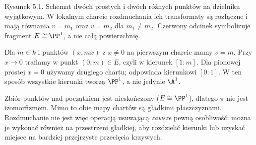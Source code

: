 \begin{center}

{\small Rysunek 5.1. Schemat dwóch prostych i dwóch różnych punktów na dzielniku wyjątkowym. W lokalnym charcie rozdmuchania ich transformaty są rozłączne i mają równania $v=m_1$ oraz $v=m_2$ dla $m_1\ne m_2$. Czerwony odcinek symbolizuje fragment $E\cong\PP^1$, a nie całą powierzchnię.}\par
\end{center}

\begin{przyklad}
Dla $m\in k$ i punktów $(x,mx)$ z $x\ne0$ na
pierwszym charcie mamy $v=m$. Przy $x\to0$ trafiamy
w punkt $(0,m)\in E$, czyli w kierunek $[1:m]$.
Dla pionowej prostej $x=0$ używamy drugiego chartu;
odpowiada kierunkowi $[0:1]$. W ten sposób wszystkie
kierunki tworzą $\PP^1$, a nie jedynie $\A^1$.
\end{przyklad}

\begin{przyklad}
Zbiór punktów nad początkiem jest nieskończony
($E\cong\PP^1$), dlatego $\pi$ nie jest
izomorfizmem. Mimo to obie mapy chartów są
gładkimi płaszczyznami. Rozdmuchanie nie jest więc
operacją usuwającą \emph{zawsze} pewną osobliwość:
można je wykonać również na przestrzeni gładkiej,
aby rozdzielić kierunki lub uzyskać miejsce na
bardziej przejrzyste przecięcia krzywych.
\end{przyklad}

